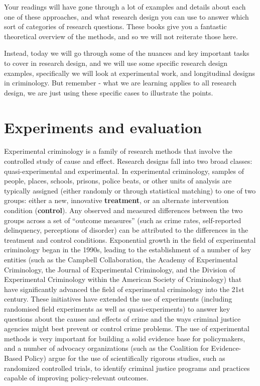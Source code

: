 \documentclass[
]{book}
\begin{document}
Your readings will have gone through a lot of examples and details about each one of these approaches, and what research design you can use to answer which sort of categories of research questions. These books give you a fantastic theoretical overview of the methods, and so we will not reiterate those here.

Instead, today we will go through some of the nuances and key important tasks to cover in research design, and we will use some specific research design examples, specifically we will look at experimental work, and longitudinal designs in criminology. But remember - what we are learning applies to all research design, we are just using these specific cases to illustrate the points.

\hypertarget{experiments-and-evaluation}{%
\section{Experiments and evaluation}\label{experiments-and-evaluation}}

Experimental criminology is a family of research methods that involve the controlled study of cause and effect. Research designs fall into two broad classes: quasi-experimental and experimental. In experimental criminology, samples of people, places, schools, prisons, police beats, or other units of analysis are typically assigned (either randomly or through statistical matching) to one of two groups: either a new, innovative \textbf{treatment}, or an alternate intervention condition (\textbf{control}). Any observed and measured differences between the two groups across a set of ``outcome measures'' (such as crime rates, self-reported delinquency, perceptions of disorder) can be attributed to the differences in the treatment and control conditions. Exponential growth in the field of experimental criminology began in the 1990s, leading to the establishment of a number of key entities (such as the Campbell Collaboration, the Academy of Experimental Criminology, the Journal of Experimental Criminology, and the Division of Experimental Criminology within the American Society of Criminology) that have significantly advanced the field of experimental criminology into the 21st century. These initiatives have extended the use of experiments (including randomised field experiments as well as quasi-experiments) to answer key questions about the causes and effects of crime and the ways criminal justice agencies might best prevent or control crime problems. The use of experimental methods is very important for building a solid evidence base for policymakers, and a number of advocacy organizations (such as the Coalition for Evidence- Based Policy) argue for the use of scientifically rigorous studies, such as randomized controlled trials, to identify criminal justice programs and practices capable of improving policy-relevant outcomes.
\end{document}
